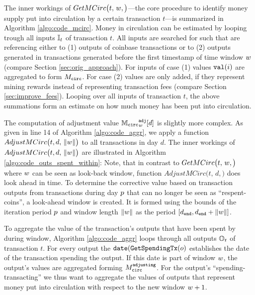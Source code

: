 The inner workings of \(GetMCirc\bigl(t,\,{w},\bigr)\)---the core procedure to identify money supply put into circulation by a certain transaction \(t\)---is summarized in Algorithm \ref{algo:code_mcirc}.%
Money in circulation can be estimated by looping trough all inputs \({\mathbb{I}}_{t}\) of transaction \(t\). %
All inputs are searched for such that are referencing either to (1) outputs of coinbase transactions or to (2) outputs generated in transactions generated before the first timestamp of time window \({w}\) (compare Section \ref{sec:orig_approach}). %
For inputs of case (1) values \({\mathtt{val}}(i)\) are aggregated to form \({M_{\mathtt{circ}}}\). %
For case (2) values are only added, if they represent mining rewards instead of representing transaction fees (compare Section \ref{sec:improve_fees}). %
Looping over all inputs of transaction \(t\), the above summations form an estimate on how much money has been put into circulation. %

The computation of adjustment value \({{\mathbb{M}_{\mathtt{circ}}}^{\mathtt{adj}}_{{w}}}[d]\) is slightly more complex. %
As given in line 14 of Algorithm \ref{algo:code_aggr}, we apply a function \(AdjustMCirc\bigl(t, d,\,{\lVert w \rVert}\bigr)\) to all transactions in day \(d\). %
The inner workings of \(AdjustMCirc\bigl(t, d,\,{\lVert w \rVert}\bigr)\) are illustrated in Algorithm \ref{algo:code_outs_spent_within}: %
Note, that in contrast to \(GetMCirc\bigl(t,\,{w},\bigr)\) where \({w}\) can be seen as look-back window, function \(AdjustMCirc\bigl(t, \,d,\bigr)\) does look ahead in time. %
To determine the corrective value based on transaction outputs from transactions during day \({p}\) that can no longer be seen as ``respent-coins'', a look-ahead window is created. %
It is formed using the bounds of the iteration period \({p}\) and window length \({\lVert w \rVert}\) as the period \([d_{\mathtt{end}},d_{\mathtt{end}}+{\lVert w \rVert}]\). %

To aggregate the value of the transaction's outputs that have been spent by during window, Algorithm \ref{algo:code_aggr} loops through all outputs \({\mathbb{O}}_{t}\) of transaction \(t\). %
For every output the \(\mathtt{date}({\mathtt{GetSpendingTx}}(o)\) establishes the date of the transaction spending the output. %
If this date is part of window \({w}\), the output's values are aggregated forming \({M_{\mathtt{circ}}^{\mathtt{adjusting}}}\). %
For the output's ``spending-transacting'' we thus want to aggregate the values of outputs that represent money put into circulation with respect to the new window \({w} + 1\). %



